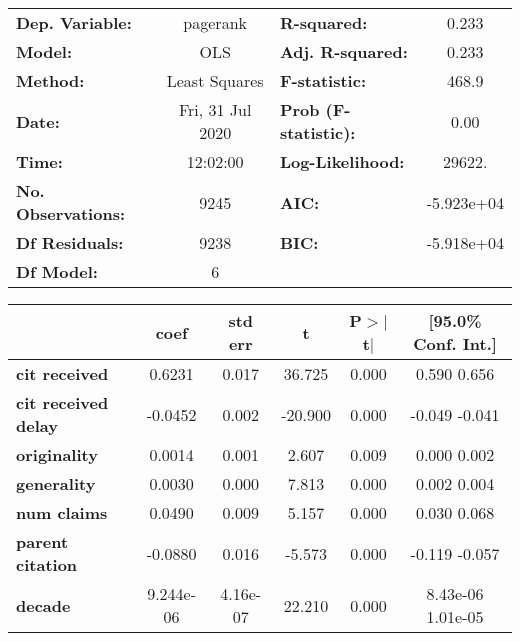 \begin{center}
\begin{tabular}{lclc}
\toprule
\textbf{Dep. Variable:}     &     pagerank     & \textbf{  R-squared:         } &      0.233    \\
\textbf{Model:}             &       OLS        & \textbf{  Adj. R-squared:    } &      0.233    \\
\textbf{Method:}            &  Least Squares   & \textbf{  F-statistic:       } &      468.9    \\
\textbf{Date:}              & Fri, 31 Jul 2020 & \textbf{  Prob (F-statistic):} &      0.00     \\
\textbf{Time:}              &     12:02:00     & \textbf{  Log-Likelihood:    } &     29622.    \\
\textbf{No. Observations:}  &        9245      & \textbf{  AIC:               } &  -5.923e+04   \\
\textbf{Df Residuals:}      &        9238      & \textbf{  BIC:               } &  -5.918e+04   \\
\textbf{Df Model:}          &           6      & \textbf{                     } &               \\
\bottomrule
\end{tabular}
\begin{tabular}{lccccc}
                            & \textbf{coef} & \textbf{std err} & \textbf{t} & \textbf{P$>$$|$t$|$} & \textbf{[95.0\% Conf. Int.]}  \\
\midrule
\textbf{cit received}       &       0.6231  &        0.017     &    36.725  &         0.000        &         0.590     0.656       \\
\textbf{cit received delay} &      -0.0452  &        0.002     &   -20.900  &         0.000        &        -0.049    -0.041       \\
\textbf{originality}        &       0.0014  &        0.001     &     2.607  &         0.009        &         0.000     0.002       \\
\textbf{generality}         &       0.0030  &        0.000     &     7.813  &         0.000        &         0.002     0.004       \\
\textbf{num claims}         &       0.0490  &        0.009     &     5.157  &         0.000        &         0.030     0.068       \\
\textbf{parent citation}    &      -0.0880  &        0.016     &    -5.573  &         0.000        &        -0.119    -0.057       \\
\textbf{decade}             &    9.244e-06  &     4.16e-07     &    22.210  &         0.000        &      8.43e-06  1.01e-05       \\

\end{tabular}
\end{center}
